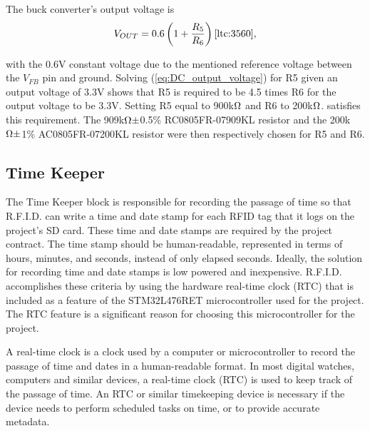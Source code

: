 
The buck converter's output voltage is
\begin{equation}
\label{eq:DC_output_voltage}
    V_{OUT} = 0.6\left(1+\frac{R_{5}}{R_{6}}\right) \cite{ltc:3560},
\end{equation}

with the 0.6V constant voltage due to the mentioned reference voltage between the $V_{FB}$ pin and ground. Solving (\ref{eq:DC_output_voltage}) for R5 given an output voltage of 3.3V shows that R5 is required to be 4.5 times R6 for the output voltage to be 3.3V. Setting R5 equal to 900k$\ohm$ and R6 to 200k$\ohm$. satisfies this requirement. The 909k$\ohm\pm$0.5\% RC0805FR-07909KL resistor and the 200k$\ohm\pm$1\% AC0805FR-07200KL resistor were then respectively chosen for R5 and R6.



\subsection{Time Keeper}
\label{ss:timekeeper}

The Time Keeper block is responsible for recording the passage of time so that R.F.I.D. can write a time and date stamp for each RFID tag that it logs on the project's SD card. These time and date stamps are required by the project contract. The time stamp should be human-readable, represented in terms of hours, minutes, and seconds, instead of only elapsed seconds. Ideally, the solution for recording time and date stamps is low powered and inexpensive. R.F.I.D. accomplishes these criteria by using the hardware real-time clock (RTC) that is included as a feature of the STM32L476RET microcontroller used for the project. The RTC feature is a significant reason for choosing this microcontroller for the project. 

A real-time clock is a clock used by a computer or microcontroller to record the passage of time and dates in a human-readable format. In most digital watches, computers and similar devices, a real-time clock (RTC) is used to keep track of the passage of time. An RTC or similar timekeeping device is necessary if the device needs to perform scheduled tasks on time, or to provide accurate metadata.

